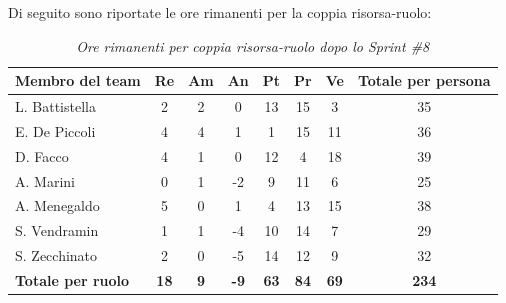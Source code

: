﻿\documentclass[a4paper, 10pt, colorlinks=true, linkcolor=black, urlcolor=blue, citecolor=blue, hidelinks]{article}
\renewcommand{\arraystretch}{1.2}
\begin{document}
Di seguito sono riportate le ore rimanenti per la coppia risorsa-ruolo:

\begin{table}[H]
    \centering
    \renewcommand{\arraystretch}{1.4}
    \begin{tabular}{|l|c|c|c|c|c|c|c|}
        \hline
        \rowcolor{bluBitless!15}
        \textbf{Membro del team} & \textbf{Re} & \textbf{Am} & \textbf{An} & \textbf{Pt} & \textbf{Pr} & \textbf{Ve} & \textbf{Totale per persona} \\
        \hline
        L. Battistella & 2 & 2 & 0 & 13 & 15 & 3 & 35 \\ \hline
        E. De Piccoli & 4 & 4 & 1 & 1 & 15 & 11 & 36 \\ \hline
        D. Facco & 4 & 1 & 0 & 12 & 4 & 18 & 39 \\ \hline
        A. Marini & 0 & 1 & -2 & 9 & 11 & 6 & 25 \\ \hline
        A. Menegaldo & 5 & 0 & 1 & 4 & 13 & 15 & 38 \\ \hline
        S. Vendramin & 1 & 1 & -4 & 10 & 14 & 7 & 29 \\ \hline
        S. Zecchinato & 2 & 0 & -5 & 14 & 12 & 9 & 32 \\ \hline
        \rowcolor{bluBitless!8}
        \textbf{Totale per ruolo} & \textbf{18} & \textbf{9} & \textbf{-9} & \textbf{63} & \textbf{84} & \textbf{69} & \textbf{234} \\
        \hline
    \end{tabular}
    \caption{\textit{Ore rimanenti per coppia risorsa-ruolo dopo lo Sprint \#8}}
\end{table}
\end{document}
